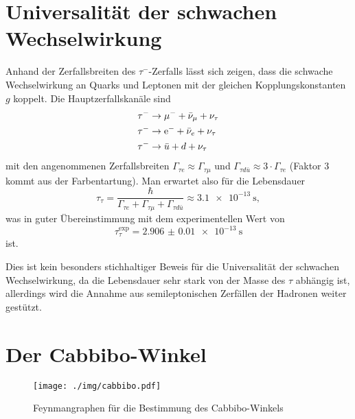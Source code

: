 \section{Universalität der schwachen Wechselwirkung}
Anhand der Zerfallsbreiten des $\tau^-$-Zerfalls lässt sich zeigen, dass die schwache Wechselwirkung an Quarks und Leptonen mit der gleichen Kopplungskonstanten $g$ koppelt.
Die Hauptzerfallskanäle sind
\begin{align*}
	\tau^- &\rightarrow \mu^- + \bar{\nu}_\mu + \nu_\tau \\
	\tau^- &\rightarrow \text{e}^- + \bar{\nu}_e + \nu_\tau \\
	\tau^- &\rightarrow \bar{u} + d + \nu_\tau
\end{align*}
mit den angenommenen Zerfallsbreiten $\Gamma_{\tau e} \approx\Gamma_{\tau \mu}$ und $\Gamma_{\tau d\bar{u}}\approx 3\cdot\Gamma_{\tau e}$ (Faktor 3 kommt aus der Farbentartung).
Man erwartet also für die Lebensdauer
\begin{equation*}
	\tau_\tau = \frac{\hbar}{\Gamma_{\tau e} + \Gamma_{\tau \mu} + \Gamma_{\tau d\bar{u}}} \approx \SI{3.1e-13}{\second},
\end{equation*}
was in guter Übereinstimmung mit dem experimentellen Wert von
\begin{equation*}
	\tau_\tau^\text{exp} = \SI{2.906(10)e-13}{\second}
\end{equation*}
ist.

Dies ist kein besonders stichhaltiger Beweis für die Universalität der schwachen Wechselwirkung, da die Lebensdauer sehr stark von der Masse des $\tau$ abhängig ist,
allerdings wird die Annahme aus semileptonischen Zerfällen der Hadronen weiter gestützt.

\section{Der Cabbibo-Winkel}
\begin{figure}
	\centering
	\texttt{[image: ./img/cabbibo.pdf]}
	\caption{Feynmangraphen für die Bestimmung des Cabbibo-Winkels}
	\label{fig:cabbibo}
\end{figure}

